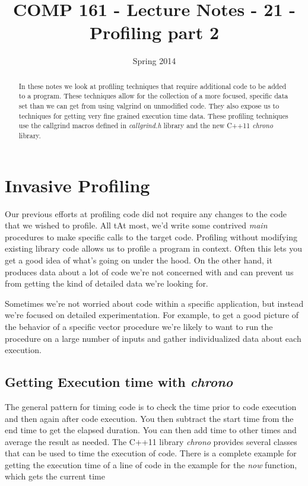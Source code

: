 \documentclass[]{tufte-handout}
\title{COMP 161 - Lecture Notes - 21 - Profiling part 2}
\date{Spring 2014}
\begin{document}
 
\maketitle

\begin{abstract}
In these notes we look at profiling techniques that require additional code to be added to a program. These techniques allow for the collection of a more focused, specific data set than we can get from using valgrind on unmodified code. They also expose us to techniques for getting very fine grained execution time data. These profiling techniques use the callgrind macros defined in \textit{callgrind.h} library and the new C++11 \textit{chrono} library. 
\end{abstract}

\section{Invasive Profiling}

Our previous efforts at profiling code did not require any changes to the code that we wished to profile. All tAt most, we'd write some contrived \textit{main} procedures to make specific calls to the target code.  Profiling without modifying existing library code allows us to profile a program in context. Often this lets you get a good idea of what's going on under the hood. On the other hand, it produces data about a lot of code we're not concerned with and can prevent us from getting the kind of detailed data we're looking for.

Sometimes we're not worried about code within a specific application, but instead we're focused on detailed experimentation. For example, to get a good picture of the behavior of a specific vector procedure we're likely to want to run the procedure on a large number of inputs and gather individualized data about each execution. 

\subsection{Getting Execution time with \textit{chrono}}

The general pattern for timing code is to check the time prior to code execution and then again after code execution. You then subtract the start time from the end time to get the elapsed duration. You can then add time to other times and average the result as needed. The C++11 library \textit{chrono} provides several classes that can be used to time the execution of code. There is a complete example for getting the execution time of a line of code in the example for the \textit{now} function, which gets the current time
\end{document}
